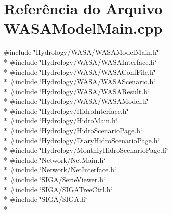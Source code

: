 \section{Referência do Arquivo W\+A\+S\+A\+Model\+Main.\+cpp}
\label{_w_a_s_a_model_main_8cpp}
{\ttfamily \#include \char`\"{}Hydrology/\+W\+A\+S\+A/\+W\+A\+S\+A\+Model\+Main.\+h\char`\"{}}\\*
{\ttfamily \#include \char`\"{}Hydrology/\+W\+A\+S\+A/\+W\+A\+S\+A\+Interface.\+h\char`\"{}}\\*
{\ttfamily \#include \char`\"{}Hydrology/\+W\+A\+S\+A/\+W\+A\+S\+A\+Conf\+File.\+h\char`\"{}}\\*
{\ttfamily \#include \char`\"{}Hydrology/\+W\+A\+S\+A/\+W\+A\+S\+A\+Scenario.\+h\char`\"{}}\\*
{\ttfamily \#include \char`\"{}Hydrology/\+W\+A\+S\+A/\+W\+A\+S\+A\+Result.\+h\char`\"{}}\\*
{\ttfamily \#include \char`\"{}Hydrology/\+W\+A\+S\+A/\+W\+A\+S\+A\+Model.\+h\char`\"{}}\\*
{\ttfamily \#include \char`\"{}Hydrology/\+Hidro\+Interface.\+h\char`\"{}}\\*
{\ttfamily \#include \char`\"{}Hydrology/\+Hidro\+Main.\+h\char`\"{}}\\*
{\ttfamily \#include \char`\"{}Hydrology/\+Hidro\+Scenario\+Page.\+h\char`\"{}}\\*
{\ttfamily \#include \char`\"{}Hydrology/\+Diary\+Hidro\+Scenario\+Page.\+h\char`\"{}}\\*
{\ttfamily \#include \char`\"{}Hydrology/\+Monthly\+Hidro\+Scenario\+Page.\+h\char`\"{}}\\*
{\ttfamily \#include \char`\"{}Network/\+Net\+Main.\+h\char`\"{}}\\*
{\ttfamily \#include \char`\"{}Network/\+Net\+Interface.\+h\char`\"{}}\\*
{\ttfamily \#include \char`\"{}S\+I\+G\+A/\+Serie\+Viewer.\+h\char`\"{}}\\*
{\ttfamily \#include \char`\"{}S\+I\+G\+A/\+S\+I\+G\+A\+Tree\+Ctrl.\+h\char`\"{}}\\*
{\ttfamily \#include \char`\"{}S\+I\+G\+A/\+S\+I\+G\+A.\+h\char`\"{}}\\*
